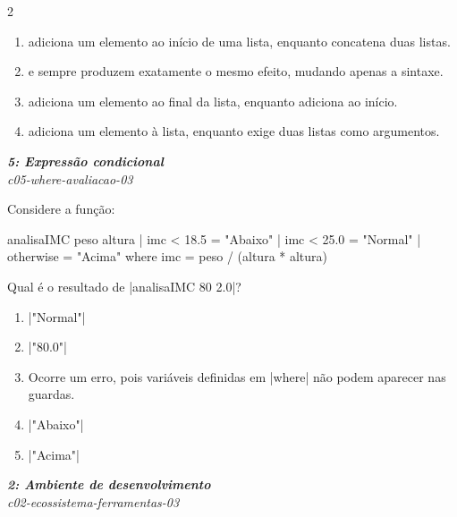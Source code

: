 \documentclass[a4paper,10pt,brazil]{article}
\begin{document}
\begin{multicols}{2}
\begin{enumerate}
  \item \haskellinline{(:)} adiciona um elemento ao início de uma lista, enquanto \haskellinline{(++)} concatena duas listas.

  \item \haskellinline{(:)} e \haskellinline{(++)} sempre produzem exatamente o mesmo efeito, mudando apenas a sintaxe.

  \item \haskellinline{(:)} adiciona um elemento ao final da lista, enquanto \haskellinline{(++)} adiciona ao início.

  \item \haskellinline{(++)} adiciona um elemento à lista, enquanto \haskellinline{(:)} exige duas listas como argumentos.


\end{enumerate}

\begin{flushright}
  \footnotesize
  \textit{\textbf{5: Expressão condicional}}\\
  \textit{c05-where-avaliacao-03}\\

\end{flushright}
Considere a função:
\begin{haskellcode}
analisaIMC peso altura
  | imc < 18.5 = "Abaixo"
  | imc < 25.0 = "Normal"
  | otherwise  = "Acima"
  where
    imc = peso / (altura * altura)
\end{haskellcode}
Qual é o resultado de \haskellinline|analisaIMC 80 2.0|?

\begin{enumerate}
  \item \haskellinline|"Normal"|

  \item \haskellinline|"80.0"|

  \item Ocorre um erro, pois variáveis definidas em \haskellinline|where| não podem aparecer nas guardas.

  \item \haskellinline|"Abaixo"|

  \item \haskellinline|"Acima"|


\end{enumerate}

\begin{flushright}
  \footnotesize
  \textit{\textbf{2: Ambiente de desenvolvimento}}\\
  \textit{c02-ecossistema-ferramentas-03}\\


\end{flushright}
\end{multicols}
\end{document}
